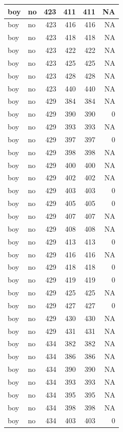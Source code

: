 \documentclass[man]{apa6}
\begin{document}
\begin{tabular}{l|l|r|r|r|r}
\hline
boy & no & 423 & 411 & 411 & NA\\
\hline
boy & no & 423 & 416 & 416 & NA\\
\hline
boy & no & 423 & 418 & 418 & NA\\
\hline
boy & no & 423 & 422 & 422 & NA\\
\hline
boy & no & 423 & 425 & 425 & NA\\
\hline
boy & no & 423 & 428 & 428 & NA\\
\hline
boy & no & 423 & 440 & 440 & NA\\
\hline
boy & no & 429 & 384 & 384 & NA\\
\hline
boy & no & 429 & 390 & 390 & 0\\
\hline
boy & no & 429 & 393 & 393 & NA\\
\hline
boy & no & 429 & 397 & 397 & 0\\
\hline
boy & no & 429 & 398 & 398 & NA\\
\hline
boy & no & 429 & 400 & 400 & NA\\
\hline
boy & no & 429 & 402 & 402 & NA\\
\hline
boy & no & 429 & 403 & 403 & 0\\
\hline
boy & no & 429 & 405 & 405 & 0\\
\hline
boy & no & 429 & 407 & 407 & NA\\
\hline
boy & no & 429 & 408 & 408 & NA\\
\hline
boy & no & 429 & 413 & 413 & 0\\
\hline
boy & no & 429 & 416 & 416 & NA\\
\hline
boy & no & 429 & 418 & 418 & 0\\
\hline
boy & no & 429 & 419 & 419 & 0\\
\hline
boy & no & 429 & 425 & 425 & NA\\
\hline
boy & no & 429 & 427 & 427 & 0\\
\hline
boy & no & 429 & 430 & 430 & NA\\
\hline
boy & no & 429 & 431 & 431 & NA\\
\hline
boy & no & 434 & 382 & 382 & NA\\
\hline
boy & no & 434 & 386 & 386 & NA\\
\hline
boy & no & 434 & 390 & 390 & NA\\
\hline
boy & no & 434 & 393 & 393 & NA\\
\hline
boy & no & 434 & 395 & 395 & NA\\
\hline
boy & no & 434 & 398 & 398 & NA\\
\hline
boy & no & 434 & 403 & 403 & 0\\

\end{tabular}
\end{document}

